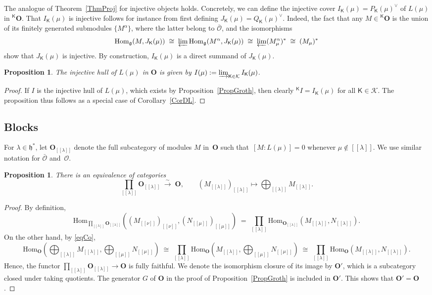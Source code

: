 \documentclass[11pt]{amsart}
\newcommand{\lbra}{[\![}
\newcommand{\rbra}{]\!]}
\newcommand{\cK}{\mathcal{K}}
\newcommand{\KKK}{\mathsf{K}}
\newcommand{\cO}{\mathcal O}
\newcommand{\bO}{\mathbf{O}}
\newcommand{\Hom}{\mathrm{Hom}}
\newcommand{\fg}{\mathfrak{g}}
\newcommand{\fh}{\mathfrak{h}}
\numberwithin{equation}{section}
\theoremstyle{plain}
\newtheorem{prop}[subsubsection]{Proposition}
\theoremstyle{remark}
\theoremstyle{remark}
\theoremstyle{construction}
\begin{document}
\subsubsection{} The analogue of Theorem~\ref{ThmProj} for injective objects holds. Concretely, we can define the injective cover $I_{\KKK}(\mu)=P_{\KKK}(\mu)^\vee$ of $L(\mu)$ in ${}^{\KKK}\bO$. That $I_{\KKK}(\mu)$ is injective follows for instance from first defining $J_{\KKK}(\mu)=Q_{\KKK}(\mu)^\vee$. Indeed, the fact that any $M\in {}^{\KKK}\bO$ is the union of its finitely generated submodules $\{M^\alpha\}$, where the latter belong to $\bar{\cO}$, and {the isomorphisms}
$$\Hom_{\fg}(M,J_{\KKK}(\mu))\;\cong\;\varprojlim \Hom_{\fg}(M^\alpha,J_{\KKK}(\mu))\;\cong\;\varprojlim (M^\alpha_\mu)^\ast\;\cong\; (M_\mu)^\ast$$
show that $J_{\KKK}(\mu)$ is injective. By construction, $I_{\KKK}(\mu)$ is a direct summand of $J_{\KKK}(\mu)$.
\begin{prop}
The injective hull of $L(\mu)$ in $\bO$ is given by $I(\mu):=\varinjlim_{\KKK\in\cK} I_{\KKK}(\mu)$.\end{prop}
\begin{proof}
If $I$ is the injective hull of $L(\mu)$, which exists by Proposition~\ref{PropGroth}, then clearly $^{\KKK}I=I_{\KKK}(\mu)$ for all $\KKK\in\cK$. The proposition thus follows as a special case of Corollary~\ref{CorDL}.
\end{proof}

\subsection{Blocks}
For $\lambda\in\fh^\ast$, let $\bO_{\lbra \lambda\rbra}$ denote the full subcategory of modules $M$ in~$\bO$ such that~$[M:L(\mu)]=0$ whenever $\mu\not\in\lbra\lambda\rbra$. We use similar notation for $\bar{\cO}$ and~$\cO$.

\begin{prop}\label{PropBlocks}
{There is} an equivalence of categories
$$\prod_{\lbra \lambda\rbra}\bO_{\lbra \lambda\rbra}\;\stackrel{\sim}{\to}\; \bO,\qquad (M_{\lbra\lambda\rbra})_{\lbra\lambda\rbra}\mapsto\bigoplus_{\lbra\lambda\rbra}M_{\lbra\lambda\rbra}.$$
\end{prop}
\begin{proof}
By definition,
$$\Hom_{\prod_{\lbra \lambda\rbra}\bO_{\lbra \lambda\rbra}}\left((M_{\lbra\nu\rbra})_{\lbra\nu\rbra},(N_{\lbra\mu\rbra})_{\lbra\mu\rbra}\right)\;=\;\prod_{\lbra\lambda\rbra}\Hom_{\bO_{\lbra\lambda\rbra}}(M_{\lbra\lambda\rbra},N_{\lbra\lambda\rbra}).$$
On the other hand, by \eqref{eqCo},
$$\Hom_{\bO}(\bigoplus_{\lbra\lambda\rbra}M_{\lbra\lambda\rbra},\bigoplus_{\lbra\mu\rbra}N_{\lbra\mu\rbra})\;\cong\; \prod_{\lbra\lambda\rbra}\Hom_{\bO}(M_{\lbra\lambda\rbra},\bigoplus_{\lbra\mu\rbra}N_{\lbra\mu\rbra})\;\cong\; \prod_{\lbra\lambda\rbra}\Hom_{\bO}(M_{\lbra\lambda\rbra},N_{\lbra\lambda\rbra}).$$
Hence, the functor $\prod_{\lbra \lambda\rbra}\bO_{\lbra \lambda\rbra}\to \bO$ is fully faithful. We denote the isomorphism closure of its image by $\bO'$, which is a subcategory closed under taking quotients. The generator $G$ of $\bO$ in the proof of Proposition~\ref{PropGroth} is included in $\bO'$. This shows that $\bO'=\bO$.
\end{proof}
\end{document}
